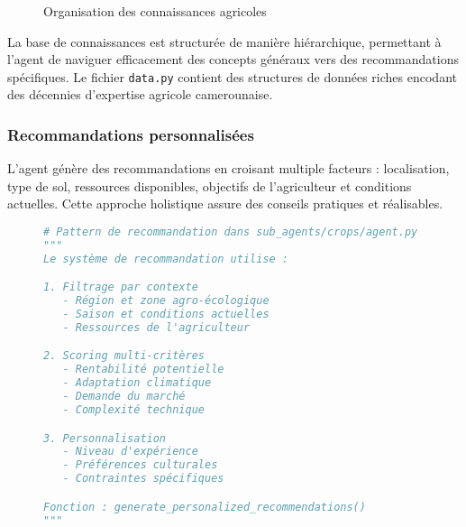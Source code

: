 \begin{figure}[H]
\centering
{}
\caption{Organisation des connaissances agricoles}
\end{figure}

La base de connaissances est structurée de manière hiérarchique, permettant à l'agent de naviguer efficacement des concepts généraux vers des recommandations spécifiques. Le fichier \texttt{data.py} contient des structures de données riches encodant des décennies d'expertise agricole camerounaise.

\subsubsection{Recommandations personnalisées}

L'agent génère des recommandations en croisant multiple facteurs : localisation, type de sol, ressources disponibles, objectifs de l'agriculteur et conditions actuelles. Cette approche holistique assure des conseils pratiques et réalisables.

\begin{figure}[H]
\centering
\begin{lstlisting}[language=Python, caption=Système de recommandation (concept)]
# Pattern de recommandation dans sub_agents/crops/agent.py
"""
Le système de recommandation utilise :

1. Filtrage par contexte
   - Région et zone agro-écologique
   - Saison et conditions actuelles
   - Ressources de l'agriculteur

2. Scoring multi-critères
   - Rentabilité potentielle
   - Adaptation climatique
   - Demande du marché
   - Complexité technique

3. Personnalisation
   - Niveau d'expérience
   - Préférences culturales
   - Contraintes spécifiques

Fonction : generate_personalized_recommendations()
"""
\end{lstlisting}
\end{figure}

